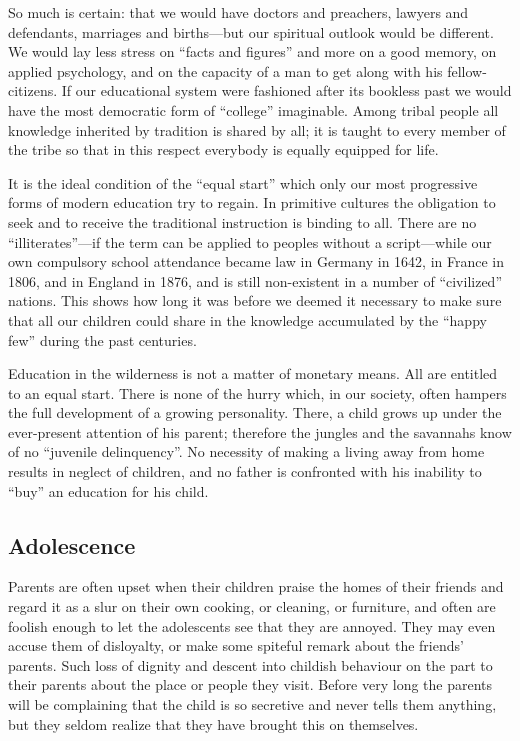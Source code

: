 \documentclass[11pt]{article}
\begin{document}
So much is certain: that we would have doctors and preachers, lawyers and defendants, marriages and births---but our spiritual outlook would be different. We would lay less stress on ``facts and figures'' and more on a good memory, on applied psychology, and on the capacity of a man to get along with his fellow-citizens. If our educational system were fashioned after its bookless past we would have the most democratic form of ``college'' imaginable. Among tribal people all knowledge inherited by tradition is shared by all; it is taught to every member of the tribe so that in this respect everybody is equally equipped for life.

It is the ideal condition of the ``equal start'' which only our most progressive forms of modern education try to regain. In primitive cultures the obligation to seek and to receive the traditional instruction is binding to all. There are no ``illiterates''---if the term can be applied to peoples without a script---while our own compulsory school attendance became law in Germany in 1642, in France in 1806, and in England in 1876, and is still non-existent in a number of ``civilized'' nations. This shows how long it was before we deemed it necessary to make sure that all our children could share in the knowledge accumulated by the ``happy few'' during the past centuries.

Education in the wilderness is not a matter of monetary means. All are entitled to an equal start. There is none of the hurry which, in our society, often hampers the full development of a growing personality. There, a child grows up under the ever-present attention of his parent; therefore the jungles and the savannahs know of no ``juvenile delinquency''. No necessity of making a living away from home results in neglect of children, and no father is confronted with his inability to ``buy'' an education for his child.
\subsection{Adolescence}
\label{sec-2-34}

Parents are often upset when their children praise the homes of their friends and regard it as a slur on their own cooking, or cleaning, or furniture, and often are foolish enough to let the adolescents see that they are annoyed. They may even accuse them of disloyalty, or make some spiteful remark about the friends' parents. Such loss of dignity and descent into childish behaviour on the part to their parents about the place or people they visit. Before very long the parents will be complaining that the child is so secretive and never tells them anything, but they seldom realize that they have brought this on themselves. 
\end{document}
